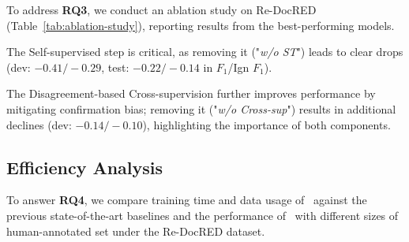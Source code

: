 To address \textbf{RQ3}, we conduct an ablation study on Re-DocRED (Table~\ref{tab:ablation-study}), reporting results from the best-performing models.

The Self-supervised step is critical, as removing it ("\textit{w/o ST}") leads to clear drops (dev: $-0.41/-0.29$, test: $-0.22/-0.14$ in $F_1$/Ign $F_1$).

The Disagreement-based Cross-supervision further improves performance by mitigating confirmation bias; removing it ("\textit{w/o Cross-sup}") results in additional declines (dev: $-0.14/-0.10$), highlighting the importance of both components.

\begin{table}
    \centering
    \caption{Ablation study on the Re-DocRED's development set.}
    \label{tab:ablation-study}
    \vspace{-3mm}
\end{table}

\subsection{Efficiency Analysis}
To answer \textbf{RQ4}, we compare training time and data usage of \model\ against the previous state-of-the-art baselines and the performance of \model\ with different sizes of human-annotated set under the Re-DocRED dataset.

